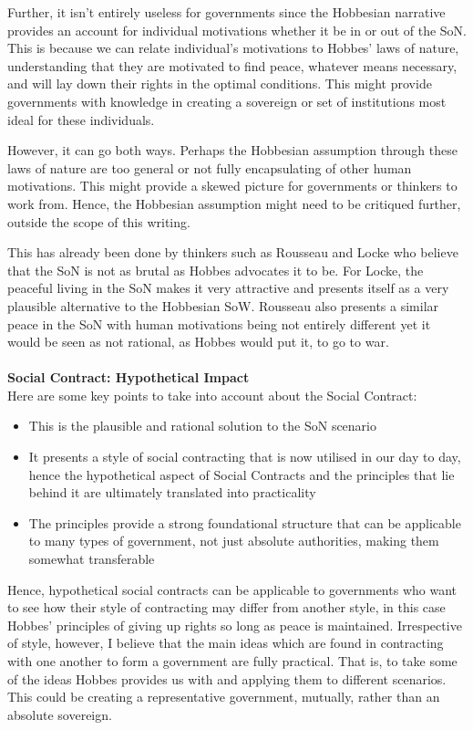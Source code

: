 \documentclass[12pt, letterpaper]{article}
\begin{document}
Further, it isn't entirely useless for governments since the Hobbesian narrative provides an account for individual motivations whether it be in or out of the SoN. This is because we can relate individual's motivations to Hobbes' laws of nature, understanding that they are motivated to find peace, whatever means necessary, and will lay down their rights in the optimal conditions. This might provide governments with knowledge in creating a sovereign or set of institutions most ideal for these individuals.

However, it can go both ways. Perhaps the Hobbesian assumption through these laws of nature are too general or not fully encapsulating of other human motivations. This might provide a skewed picture for governments or thinkers to work from. Hence, the Hobbesian assumption might need to be critiqued further, outside the scope of this writing.

This has already been done by thinkers such as Rousseau and Locke who believe that the SoN is not as brutal as Hobbes advocates it to be. For Locke, the peaceful living in the SoN makes it very attractive and presents itself as a very plausible alternative to the Hobbesian SoW. Rousseau also presents a similar peace in the SoN with human motivations being not entirely  different yet it would be seen as not rational, as Hobbes would put it, to go to war.\\\\
\textbf{Social Contract: Hypothetical Impact}\\
Here are some key points to take into account about the Social Contract:
\begin{itemize}
	\item This is the plausible and rational solution to the SoN scenario
	\item It presents a style of social contracting that is now utilised in our day to day, hence the hypothetical aspect of Social Contracts and the principles that lie behind it are ultimately translated into practicality
	\item The principles provide a strong foundational structure that can be applicable to many types of government, not just absolute authorities, making them somewhat transferable
\end{itemize}
Hence, hypothetical social contracts can be applicable to governments who want to see how their style of contracting may differ from another style, in this case Hobbes' principles of giving up rights so long as peace is maintained. Irrespective of style, however, I believe that the main ideas which are found in contracting with one another to form a government are fully practical. That is, to take some of the ideas Hobbes provides us with and applying them to different scenarios. This could be creating a representative government, mutually, rather than an absolute sovereign.
\end{document}
